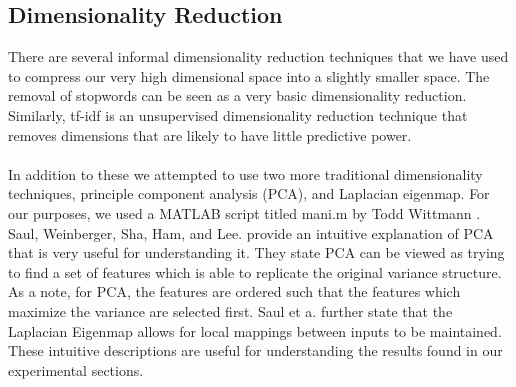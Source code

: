 \subsection{Dimensionality Reduction}
There are several informal dimensionality reduction techniques that we have used to compress our very high dimensional space into a slightly smaller space. The removal of stopwords can be seen as a very basic dimensionality reduction. Similarly, tf-idf is an unsupervised dimensionality reduction technique that removes dimensions that are likely to have little predictive power.  
\\
\\In addition to these we attempted to use two more traditional dimensionality techniques, principle component analysis (PCA), and Laplacian eigenmap.  For our purposes, we used a MATLAB script titled mani.m by Todd Wittmann \cite{Wittman}.   Saul, Weinberger, Sha, Ham, and Lee. \cite{saul06spectral} provide an intuitive explanation of PCA that is very useful for understanding it.  They state PCA can be viewed as trying to find a set of features which is able to replicate the original variance structure.  As a note, for PCA, the features are ordered such that the features which maximize the variance are selected first.  Saul et a.\cite{saul06spectral} further state that the Laplacian Eigenmap allows for local mappings between inputs to be maintained.  These intuitive descriptions are useful for understanding the results found in our experimental sections.




